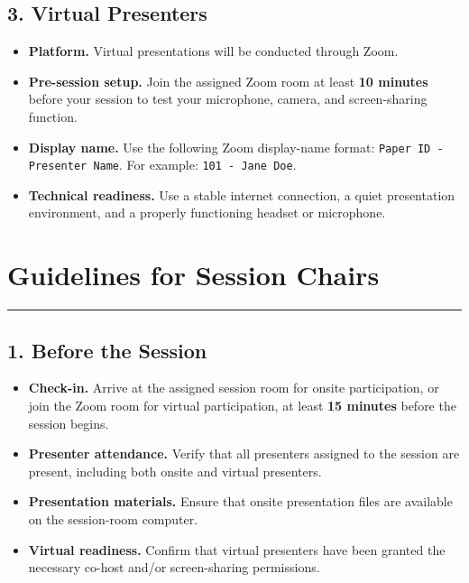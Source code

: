 \documentclass[10pt,a4paper]{article}
\begin{document}
\vspace{0.8em}

\subsection*{\color{conf}3. Virtual Presenters}

\begin{itemize}[leftmargin=*, noitemsep]
    \item \textbf{Platform.} Virtual presentations will be conducted through Zoom.

    \item \textbf{Pre-session setup.} Join the assigned Zoom room at least
    \textbf{10 minutes} before your session to test your microphone, camera,
    and screen-sharing function.

    \item \textbf{Display name.} Use the following Zoom display-name format:
    \texttt{Paper ID - Presenter Name}. For example:
    \texttt{101 - Jane Doe}.

    \item \textbf{Technical readiness.} Use a stable internet connection, a quiet
    presentation environment, and a properly functioning headset or microphone.
\end{itemize}

\clearpage
\section{\textbf{Guidelines for Session Chairs}}
\color{conf}\rule{\linewidth}{1pt}\color{black}
\vspace{0.8em}

\subsection*{\color{conf}1. Before the Session}

\begin{itemize}[leftmargin=*, noitemsep]
    \item \textbf{Check-in.} Arrive at the assigned session room for onsite
    participation, or join the Zoom room for virtual participation, at least
    \textbf{15 minutes} before the session begins.

    \item \textbf{Presenter attendance.} Verify that all presenters assigned to
    the session are present, including both onsite and virtual presenters.

    \item \textbf{Presentation materials.} Ensure that onsite presentation files
    are available on the session-room computer.

    \item \textbf{Virtual readiness.} Confirm that virtual presenters have been
    granted the necessary co-host and/or screen-sharing permissions.
\end{itemize}
\end{document}
